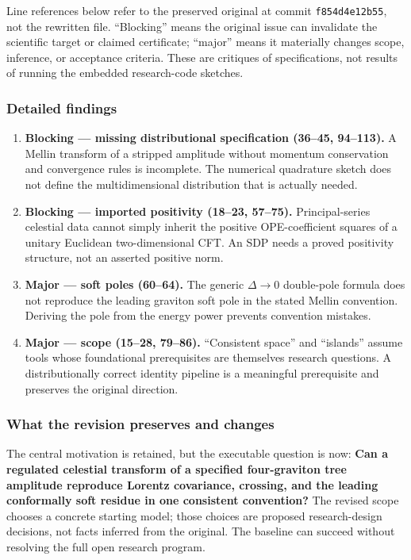 \documentclass[
  11pt,
]{article}
\begin{document}
Line references below refer to the preserved original at commit
\texttt{f854d4e12b55}, not the rewritten file. ``Blocking'' means the
original issue can invalidate the scientific target or claimed
certificate; ``major'' means it materially changes scope, inference, or
acceptance criteria. These are critiques of specifications, not results
of running the embedded research-code sketches.

\subsubsection{Detailed findings}

\begin{enumerate}
\def\labelenumi{\arabic{enumi}.}
\item
  \textbf{Blocking --- missing distributional specification (36--45,
  94--113).} A Mellin transform of a stripped amplitude without momentum
  conservation and convergence rules is incomplete. The numerical
  quadrature sketch does not define the multidimensional distribution
  that is actually needed.
\item
  \textbf{Blocking --- imported positivity (18--23, 57--75).}
  Principal-series celestial data cannot simply inherit the positive
  OPE-coefficient squares of a unitary Euclidean two-dimensional CFT. An
  SDP needs a proved positivity structure, not an asserted positive
  norm.
\item
  \textbf{Major --- soft poles (60--64).} The generic
  \ensuremath{\Delta}\ensuremath{\to}0 double-pole formula does not
  reproduce the leading graviton soft pole in the stated Mellin
  convention. Deriving the pole from the energy power prevents
  convention mistakes.
\item
  \textbf{Major --- scope (15--28, 79--86).} ``Consistent space'' and
  ``islands'' assume tools whose foundational prerequisites are
  themselves research questions. A distributionally correct identity
  pipeline is a meaningful prerequisite and preserves the original
  direction.
\end{enumerate}

\subsubsection{What the revision preserves and changes}

The central motivation is retained, but the executable question is now:
\textbf{Can a regulated celestial transform of a specified four-graviton
tree amplitude reproduce Lorentz covariance, crossing, and the leading
conformally soft residue in one consistent convention?} The revised
scope chooses a concrete starting model; those choices are proposed
research-design decisions, not facts inferred from the original. The
baseline can succeed without resolving the full open research program.
\end{document}
